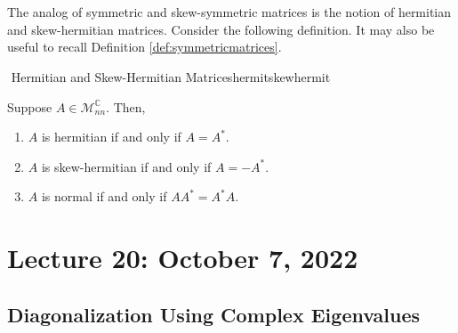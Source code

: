         \vphantom
        \\
        \\
        The analog of symmetric and skew-symmetric matrices is the notion of hermitian and skew-hermitian matrices. Consider the following definition. It may also be useful to recall Definition \ref{def:symmetricmatrices}.
        \begin{definition}{\Stop\,\,Hermitian and Skew-Hermitian Matrices}{hermitskewhermit}

            Suppose \(A\in\mathcal{M}_{nn}^\mathbb{C}\). Then,
            \begin{enumerate}
                \item \(A\) is hermitian if and only if \(A=A^*\).
                \item \(A\) is skew-hermitian if and only if \(A=-A^*\).
                \item \(A\) is normal if and only if \(AA^*=A^*A\).
            \end{enumerate}
            
        \end{definition}

\pagebreak

\section{Lecture 20: October 7, 2022}

    \subsection{Diagonalization Using Complex Eigenvalues}

